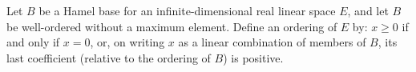Let $B$ be a Hamel base for an infinite-dimensional real linear space $E$, and let $B$ be well-ordered without a maximum element. Define an ordering of $E$ by: $x \geq 0$ if and only if $x = 0$, or, on writing $x$ as a linear combination of members of $B$, its last coefficient (relative to the ordering of $B$) is positive.
